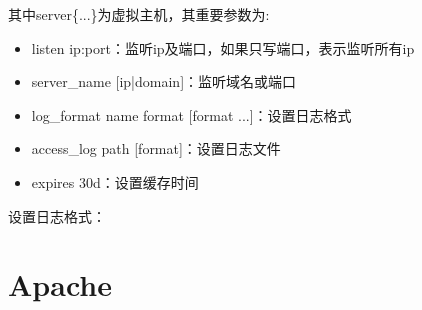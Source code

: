 \documentclass[UTF8]{ctexart}
\begin{document}
其中server\{...\}为虚拟主机，其重要参数为:

\begin{itemize}
  \item listen ip:port：监听ip及端口，如果只写端口，表示监听所有ip
  \item server\_name [ip|domain]：监听域名或端口
  \item log\_format name format [format ...]：设置日志格式
  \item access\_log path [format]：设置日志文件
  \item expires 30d：设置缓存时间
\end{itemize}

设置日志格式：

\clearpage

\section{Apache}
\end{document}
